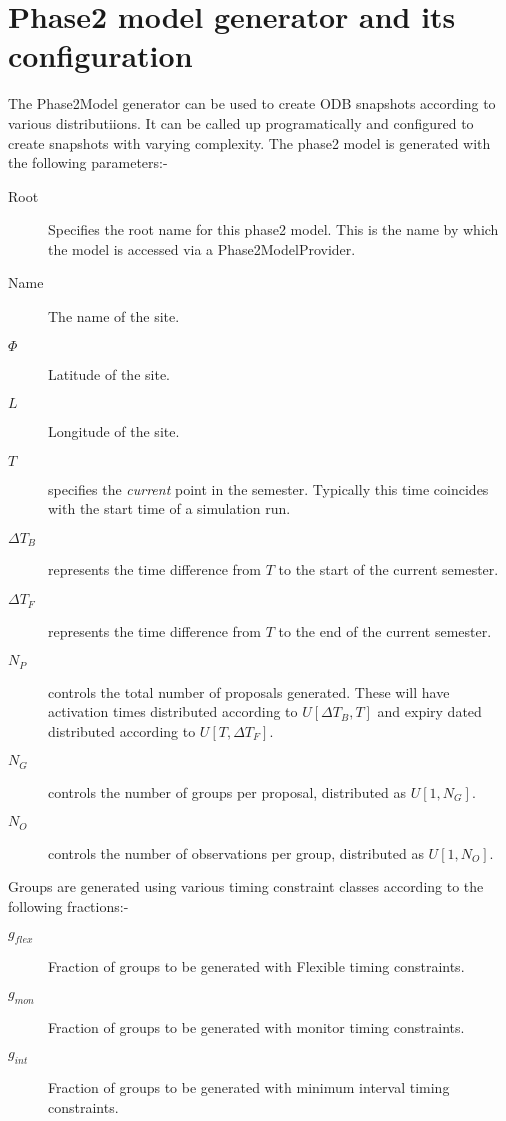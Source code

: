 \appendix

\section{Phase2 model generator and its configuration}
\label{sect:app_p2gen}

The Phase2Model generator can be used to create ODB snapshots according to various distributiions. It can be called up programatically and configured to create snapshots with varying complexity. The phase2 model is generated with the following parameters:-

\begin{description}
\item [Root] Specifies the root name for this phase2 model. This is the name by which the model is accessed via a Phase2ModelProvider.
\item [Name] The name of the site.
\item [$\Phi$] Latitude of the site.
\item [$L$] Longitude of the site.
\item [$T$]  specifies the \emph{current} point in the semester. Typically this time coincides with the start time of a simulation run.
\item [$\Delta{T_B}$] represents the time difference from $T$ to the start of the current semester.
\item [$\Delta{T_F}$] represents the time difference from $T$ to the end of the current semester.
\item [$N_P$] controls the total number of proposals generated. These will have activation times distributed according to $U[\Delta{T_B}, T]$ and expiry dated distributed according to  $U[T, \Delta{T_F}]$.
\item [$N_G$] controls the number of groups per proposal, distributed as $U[1, N_G]$.
\item [$N_O$] controls the number of observations per group, distributed as $U[1, N_O]$.
\end{description}

Groups are generated using various timing constraint classes according to the following fractions:-
\begin{description}
\item [$g_{flex}$] Fraction of groups to be generated with Flexible timing constraints.
\item [$g_{mon}$]  Fraction of groups to be generated with monitor timing constraints.
\item [$g_{int}$]  Fraction of groups to be generated with minimum interval timing constraints.
\end{description}

